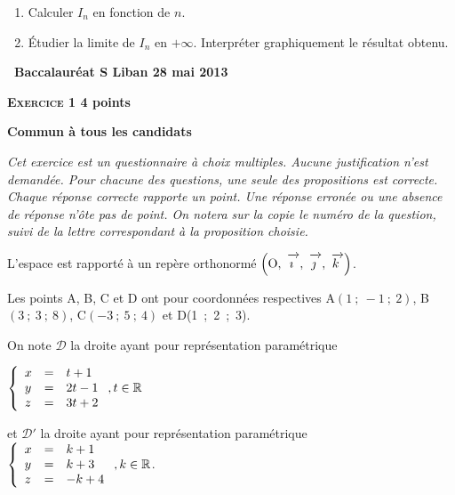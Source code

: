 \documentclass[10pt]{article}
\newcommand{\R}{\mathbb{R}}
\newcommand{\vect}[1]{\mathchoice%
{\overrightarrow{\displaystyle\mathstrut#1\,\,}}%
{\overrightarrow{\textstyle\mathstrut#1\,\,}}%
{\overrightarrow{\scriptstyle\mathstrut#1\,\,}}%
{\overrightarrow{\scriptscriptstyle\mathstrut#1\,\,}}}
\def\Oijk{$\left(\text{O},~\vect{\imath},~\vect{\jmath},~\vect{k}\right)$}
\begin{document}
\begin{enumerate}
\begin{enumerate}
On admet que la fonction $F$, définie sur l'intervalle $]0~;~+ \infty[$ par $F(x) = \dfrac{- 2 - \ln (x)}{x}$,est une primitive de la fonction $f$ sur l'intervalle $]0~;~+ \infty[$. 
		\item Calculer $I_{n}$ en fonction de $n$. 
		\item Étudier la limite de $I_{n}$ en $+ \infty$. Interpréter graphiquement le résultat obtenu.
	\end{enumerate} 
\end{enumerate}
\newpage
\hypertarget{Liban}{}

\renewcommand \footrulewidth{.2pt}
\pagestyle{fancy}
\thispagestyle{empty}

\begin{center}{\Large\textbf{\decofourleft~Baccalauréat S  Liban 28 mai 2013 \decofourright}}
\end{center}

\vspace{0,5cm}

\textbf{\textsc{Exercice 1} \hfill 4 points}

\textbf{Commun à tous les candidats}
 
\medskip

\emph{Cet exercice est un questionnaire à choix multiples. Aucune justification n'est demandée. Pour chacune des questions, une seule des propositions est correcte.\\ 
Chaque réponse correcte rapporte un point. Une réponse erronée ou une absence de réponse n'ôte pas de point. On notera sur la copie le numéro de la question, suivi de la lettre correspondant à la proposition choisie.}

\medskip
 
L'espace est rapporté à un repère orthonormé \Oijk. 

Les points A, B, C et D ont pour coordonnées respectives A$(1~;~-1~;~2)$, B$(3~;~3~;~8)$, C$(-3~;~5~;~4)$ et D(1~;~2~;~3). 
 
On note $\mathcal{D}$ la droite ayant pour représentation paramétrique 

$\left\{\begin{array}{l c l}
x&=&t + 1\\
y &=& 2t - 1\\   
z &=& 3t+2
\end{array}\right., t \in \R$ 
 
et $\mathcal{D}'$ la droite ayant pour représentation paramétrique $\left\{\begin{array}{l c l}
x&=& k + 1\\
y &=& k + 3\\
z &=&-k + 4
\end{array}\right.,  k \in \R$.
  
\end{document}
